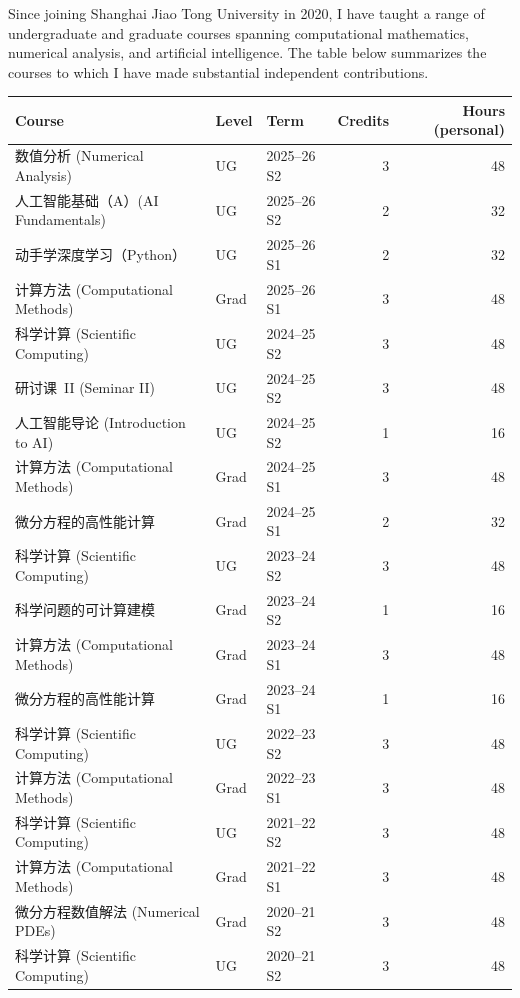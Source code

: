 \documentclass[12pt, a4paper]{article}
\begin{document}
Since joining Shanghai Jiao Tong University in 2020, I have taught a range of
undergraduate and graduate courses spanning computational mathematics, numerical
analysis, and artificial intelligence.
The table below summarizes the courses to which I have made substantial
independent contributions.

\vspace{0.5em}

{\small
  \begin{longtable}{@{}p{5.8cm} l l r r@{}}
    \toprule
    \textbf{Course} & \textbf{Level} & \textbf{Term} & \textbf{Credits} & \textbf{Hours (personal)} \\
    \midrule
    \endhead
    \bottomrule
    \endfoot
    数值分析 (Numerical Analysis)
    & UG & 2025--26 S2 & 3 & 48 \\
    人工智能基础（A）(AI Fundamentals)
    & UG & 2025--26 S2 & 2 & 32 \\
    动手学深度学习（Python）
    & UG & 2025--26 S1 & 2 & 32 \\
    计算方法 (Computational Methods)
    & Grad & 2025--26 S1 & 3 & 48 \\[2pt]
    科学计算 (Scientific Computing)
    & UG & 2024--25 S2 & 3 & 48 \\
    研讨课~II (Seminar II)
    & UG & 2024--25 S2 & 3 & 48 \\
    人工智能导论 (Introduction to AI)
    & UG & 2024--25 S2 & 1 & 16 \\
    计算方法 (Computational Methods)
    & Grad & 2024--25 S1 & 3 & 48 \\
    微分方程的高性能计算
    & Grad & 2024--25 S1 & 2 & 32 \\[2pt]
    科学计算 (Scientific Computing)
    & UG & 2023--24 S2 & 3 & 48 \\
    科学问题的可计算建模
    & Grad & 2023--24 S2 & 1 & 16 \\
    计算方法 (Computational Methods)
    & Grad & 2023--24 S1 & 3 & 48 \\
    微分方程的高性能计算
    & Grad & 2023--24 S1 & 1 & 16 \\[2pt]
    科学计算 (Scientific Computing)
    & UG & 2022--23 S2 & 3 & 48 \\
    计算方法 (Computational Methods)
    & Grad & 2022--23 S1 & 3 & 48 \\[2pt]
    科学计算 (Scientific Computing)
    & UG & 2021--22 S2 & 3 & 48 \\
    计算方法 (Computational Methods)
    & Grad & 2021--22 S1 & 3 & 48 \\[2pt]
    微分方程数值解法 (Numerical PDEs)
    & Grad & 2020--21 S2 & 3 & 48 \\
    科学计算 (Scientific Computing)
    & UG & 2020--21 S2 & 3 & 48 \\
  \end{longtable}
}
\end{document}
